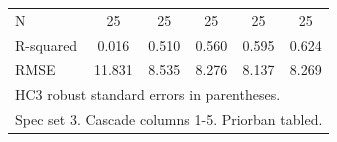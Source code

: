 \begin{table}[htbp]
\begin{tabular}{l*{5}{c}}
\midrule
N           &          25   &          25   &          25   &          25   &          25   \\
R-squared   &       0.016   &       0.510   &       0.560   &       0.595   &       0.624   \\
RMSE        &      11.831   &       8.535   &       8.276   &       8.137   &       8.269   \\
\bottomrule
\multicolumn{6}{l}{\footnotesize HC3 robust standard errors in parentheses.}\\
\multicolumn{6}{l}{\footnotesize Spec set 3. Cascade columns 1-5. Priorban tabled.}\\
\end{tabular}
\end{table}
